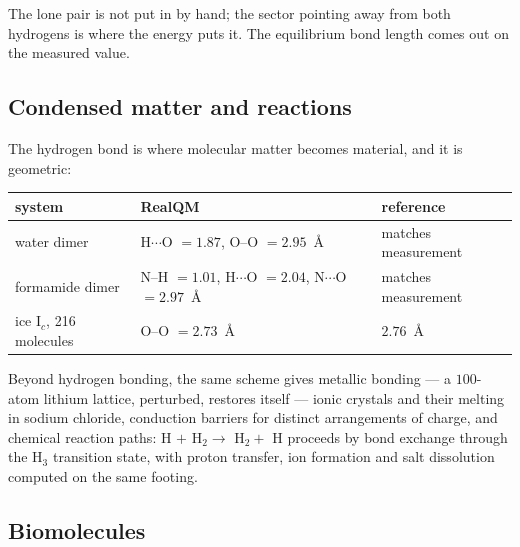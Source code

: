 \documentclass[11pt]{article}
\begin{document}
The lone pair is not put in by hand; the sector pointing away from both hydrogens is where the
energy puts it. The equilibrium bond length comes out on the measured value.

\subsection{Condensed matter and reactions}

The hydrogen bond is where molecular matter becomes material, and it is geometric:

\begin{center}
\begin{tabular}{lll}
\toprule
system & RealQM & reference \\
\midrule
water dimer              & H$\cdots$O $= 1.87$, O--O $= 2.95$~\AA & matches measurement \\
formamide dimer          & N--H $=1.01$, H$\cdots$O $=2.04$, N$\cdots$O $=2.97$~\AA & matches measurement \\
ice I$_c$, 216 molecules & O--O $= 2.73$~\AA & $2.76$~\AA \\
\bottomrule
\end{tabular}
\end{center}

Beyond hydrogen bonding, the same scheme gives metallic bonding --- a $100$-atom lithium lattice,
perturbed, restores itself --- ionic crystals and their melting in sodium chloride, conduction
barriers for distinct arrangements of charge, and chemical reaction paths: H $+$ H$_2
\rightarrow$ H$_2 +$ H proceeds by bond exchange through the H$_3$ transition state, with proton
transfer, ion formation and salt dissolution computed on the same footing.

\subsection{Biomolecules}
\end{document}
